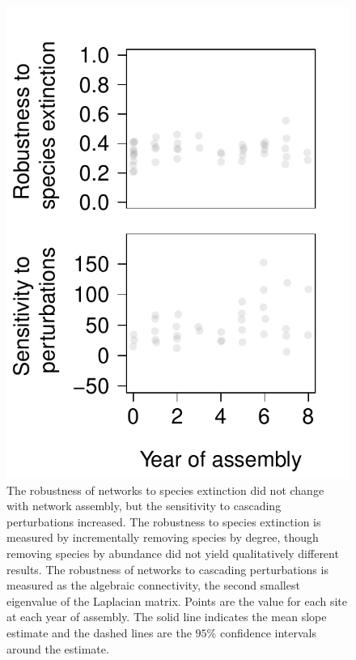 \documentclass[12pt]{article}
\begin{document}
\begin{figure}
  \centering
  \includegraphics[width=.5\textwidth]{../analysis/networkLevel/figures/robustness.pdf}
  \caption{The robustness of networks to species extinction did not
    change with network assembly, but the sensitivity to cascading
    perturbations increased. The robustness to species extinction is
    measured by incrementally removing species by degree, though
    removing species by abundance did not yield qualitatively
    different results. The robustness of networks to cascading
    perturbations is measured as the algebraic connectivity, the
    second smallest eigenvalue of the Laplacian matrix. Points are the
    value for each site at each year of assembly. The solid line
    indicates the mean slope estimate and the dashed lines are the
    $95\%$ confidence intervals around the estimate.}
  \label{fig:rob}
\end{figure}
\clearpage
\end{document}
